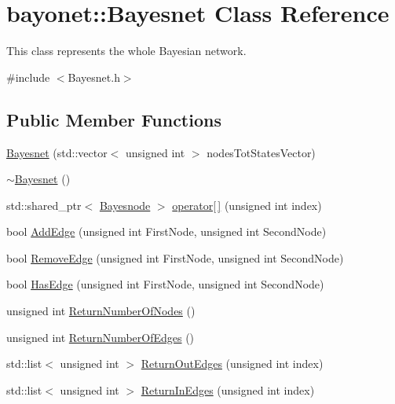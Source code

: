 \hypertarget{classbayonet_1_1_bayesnet}{\section{bayonet\-:\-:Bayesnet Class Reference}
\label{classbayonet_1_1_bayesnet}
}


This class represents the whole Bayesian network.  




{\ttfamily \#include $<$Bayesnet.\-h$>$}

\subsection*{Public Member Functions}
\begin{DoxyCompactItemize}
\item 
\hyperlink{classbayonet_1_1_bayesnet_a27bc4870f26d4bd00953d7589c2d4abd}{Bayesnet} (std\-::vector$<$ unsigned int $>$ nodes\-Tot\-States\-Vector)
\item 
\hyperlink{classbayonet_1_1_bayesnet_af0d3ee29b0676789a3c5d1c33a0e36a2}{$\sim$\-Bayesnet} ()
\item 
std\-::shared\-\_\-ptr$<$ \hyperlink{classbayonet_1_1_bayesnode}{Bayesnode} $>$ \hyperlink{classbayonet_1_1_bayesnet_a805e5513cfef8b16f5f6f38f93aab5db}{operator\mbox{[}$\,$\mbox{]}} (unsigned int index)
\item 
bool \hyperlink{classbayonet_1_1_bayesnet_aba354bf67d39dc73e070e63b9bc45ecd}{Add\-Edge} (unsigned int First\-Node, unsigned int Second\-Node)
\item 
bool \hyperlink{classbayonet_1_1_bayesnet_a0ea810411a987ebeb97b580053ce7c7f}{Remove\-Edge} (unsigned int First\-Node, unsigned int Second\-Node)
\item 
bool \hyperlink{classbayonet_1_1_bayesnet_ae852714069b47eff14918d5a4e53a2dd}{Has\-Edge} (unsigned int First\-Node, unsigned int Second\-Node)
\item 
unsigned int \hyperlink{classbayonet_1_1_bayesnet_a2d68782e4d08abf2bb2f0ad093db78cc}{Return\-Number\-Of\-Nodes} ()
\item 
unsigned int \hyperlink{classbayonet_1_1_bayesnet_a42e6612c84beb2d4e6d5c55792f3ed4e}{Return\-Number\-Of\-Edges} ()
\item 
std\-::list$<$ unsigned int $>$ \hyperlink{classbayonet_1_1_bayesnet_acb33076271f03ba59ac98a04b762d26b}{Return\-Out\-Edges} (unsigned int index)
\item 
std\-::list$<$ unsigned int $>$ \hyperlink{classbayonet_1_1_bayesnet_a5621b949d8fda17ae0efd9810655b1b3}{Return\-In\-Edges} (unsigned int index)

\end{DoxyCompactItemize}
